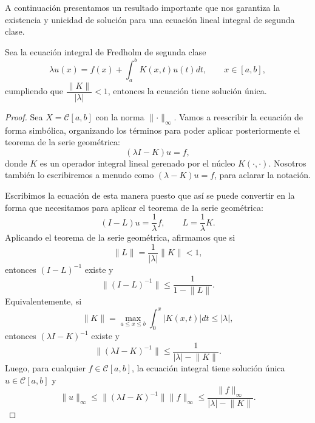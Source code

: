 A continuación presentamos un resultado importante que nos garantiza la existencia y unicidad de solución para una ecuación lineal integral de segunda clase.
\begin{corolario}\label{ej:1}
	Sea la ecuación integral de Fredholm de segunda clase
	\begin{equation}
	\lambda	u(x) = f(x)+ \int_{a}^{b}K(x,t)u(t)dt, \qquad x \in [a,b],
	\end{equation}
	cumpliendo que $\dfrac{\lVert K \rVert}{\lvert \lambda \rvert} < 1$, entonces la ecuación tiene solución única.
	\begin{proof}
		Sea $X = \mathcal{C}[a,b]$ con la norma $\lVert \cdot \rVert_\infty$. Vamos a reescribir la ecuación de forma simbólica, organizando los términos para poder aplicar posteriormente el teorema de la serie geométrica:
		\begin{equation}
			(\lambda I-K)u = f,
		\end{equation}
		donde $K$ es un operador integral lineal gerenado por el núcleo $K (\cdot , \cdot )$. Nosotros también lo escribiremos a menudo como $(\lambda - K)u = f$, para aclarar la notación.
		
		Escribimos la ecuación de esta manera puesto que así se puede convertir en la forma que necesitamos para aplicar el teorema de la serie geométrica:
		\begin{equation}
			(I-L)u = \dfrac{1}{\lambda}f, \qquad L = \dfrac{1}{\lambda}K.
		\end{equation}
		Aplicando el teorema de la serie geométrica, afirmamos que si
		\begin{equation}
			\lVert L \rVert = \dfrac{1}{|\lambda |}\lVert K \rVert < 1,
		\end{equation}
		entonces $(I-L)^{-1}$ existe y
		\begin{equation}
			\lVert(I-L)^{-1}\rVert \leqslant \dfrac{1}{1 - \lVert L \rVert}.
		\end{equation}
		Equivalentemente, si
		\begin{equation}
			\lVert K \rVert = \max_{a \leqslant x \leqslant b} \int_{0}^{x}|K(x,t)|dt \leq |\lambda|,
		\end{equation}
		entonces $(\lambda I - K)^{-1}$ existe y 
		\begin{equation}
			\lVert (\lambda I - K)^{-1}\rVert \leqslant \dfrac{1}{|\lambda| - \lVert K \rVert }.
		\end{equation}
		Luego, para cualquier $f \in \mathcal{C}[a,b]$, la ecuación integral tiene solución única $u \in \mathcal{C}[a,b]$ y 
		\begin{equation}
			\lVert u \rVert_\infty \leqslant \lVert (\lambda I - K)^{-1} \rVert \lVert f \rVert_\infty \leqslant \dfrac{\lVert f \rVert_\infty}{|\lambda| - \lVert K \rVert }.
		\end{equation}
	\end{proof}
\end{corolario}
